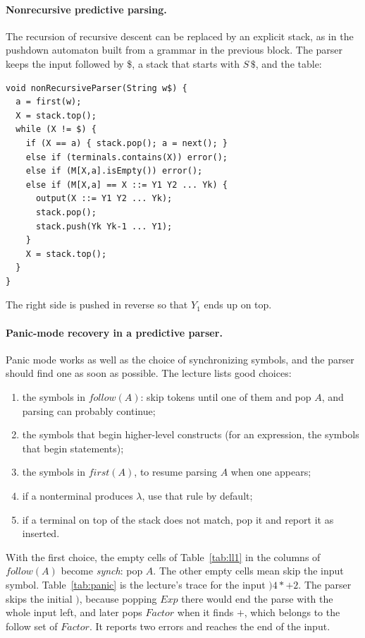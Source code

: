 \paragraph{Nonrecursive predictive parsing.} The recursion of recursive descent
can be replaced by an explicit stack, as in the pushdown automaton built from
a grammar in the previous block. The parser keeps the input followed by \$,
a stack that starts with $S\,\$$, and the table:
\begin{lstlisting}
void nonRecursiveParser(String w$) {
  a = first(w);
  X = stack.top();
  while (X != $) {
    if (X == a) { stack.pop(); a = next(); }
    else if (terminals.contains(X)) error();
    else if (M[X,a].isEmpty()) error();
    else if (M[X,a] == X ::= Y1 Y2 ... Yk) {
      output(X ::= Y1 Y2 ... Yk);
      stack.pop();
      stack.push(Yk Yk-1 ... Y1);
    }
    X = stack.top();
  }
}
\end{lstlisting}
The right side is pushed in reverse so that $Y_1$ ends up on top.

\paragraph{Panic-mode recovery in a predictive parser.} Panic mode works as well
as the choice of synchronizing symbols, and the parser should find one as soon
as possible. The lecture lists good choices:
\begin{enumerate}
  \item the symbols in $\mathit{follow}(A)$: skip tokens until one of them and
    pop $A$, and parsing can probably continue;
  \item the symbols that begin higher-level constructs (for an expression, the
    symbols that begin statements);
  \item the symbols in $\mathit{first}(A)$, to resume parsing $A$ when one appears;
  \item if a nonterminal produces $\lambda$, use that rule by default;
  \item if a terminal on top of the stack does not match, pop it and report it
    as inserted.
\end{enumerate}
With the first choice, the empty cells of Table~\ref{tab:ll1} in the columns
of $\mathit{follow}(A)$ become \textit{synch}: pop $A$. The other empty cells
mean skip the input symbol. Table~\ref{tab:panic} is the lecture's trace for
the input $)4*+2$. The parser skips the initial $)$, because popping
$\mathit{Exp}$ there would end the parse with the whole input left, and later
pops $\mathit{Factor}$ when it finds $+$, which belongs to the follow set
of $\mathit{Factor}$.
It reports two errors and reaches the end of the input.

